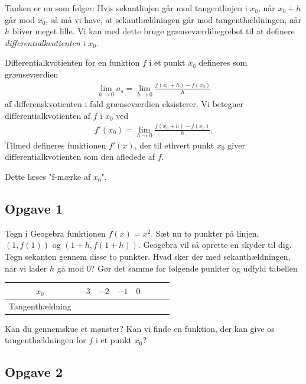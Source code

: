 Tanken er nu som følger: Hvis sekantlinjen går mod tangentlinjen i $x_0$, når $x_0 + h$ går mod $x_0$, så må vi have, at sekanthældningen går mod tangenthældningen, når $h$ bliver meget lille. Vi kan med dette bruge grænseværdibegrebet til at definere \textit{differentialkvotienten} i $x_0$. 
\newpage
\begin{defn}[Differentialkvotienten]
	Differentialkvotienten for en funktion $f$ i et punkt $x_0$ defineres som grænseværdien
	\begin{align*}
		\lim_{h \to 0} a_s = \lim_{h \to 0} \frac{f(x_0 + h)-f(x_0)}{h}
	\end{align*}
	af differenskvotienten i fald grænseværdien eksisterer. Vi betegner differentialkvotienten af $f$ i $x_0$ 
	ved
	\begin{align*}
		f'(x_0) = \lim_{h \to 0} \frac{f(x_0 + h)-f(x_0)}{h}.
	\end{align*}
	Tilmed defineres funktionen $f'(x)$, der til ethvert punkt $x_0$ giver differentialkvotienten som den
	afledede af $f$. 
\end{defn}
Dette læses "f-mærke af $x_0$".

\newpage

\subsection*{Opgave 1}

Tegn i Geogebra funktionen $f(x) = x^2$. Sæt nu to punkter på linjen, $(1,f(1))$ og $(1+h,f(1+h))$. Geogebra vil så oprette en skyder til dig. Tegn sekanten gennem disse to punkter. Hvad sker der med sekanthældningen, når vi lader $h$ gå mod $0$? Gør det samme for følgende punkter og udfyld tabellen

\begin{center}
	\begin{tabular}{c|p{0.5cm}| >{\centering\arraybackslash} p{0.5cm}|>{\centering\arraybackslash} p{0.5cm}
	| >{\centering\arraybackslash} p{0.5cm}| >{\centering\arraybackslash} p{0.5cm}
	| >{\centering\arraybackslash} p{0.5cm}|>{\centering\arraybackslash} p{0.5cm}}
		$x_0$ & $-3$ & $-2$ & $-1$ & $0$ & 1 & 2 & 3 \\
		\hline
		Tangenthældning & & & & & & &
	\end{tabular}
\end{center}

Kan du gennemskue et mønster? Kan vi finde en funktion, der kan give os tangenthældningen for $f$ i et punkt
$x_0$?

\subsection*{Opgave 2}

